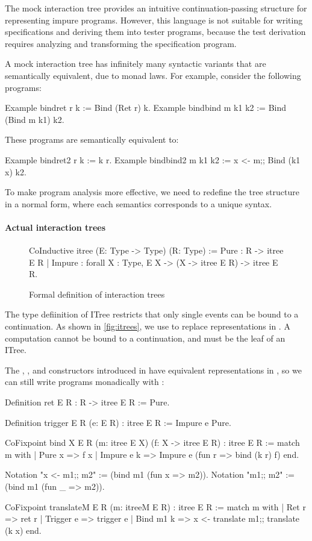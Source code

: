 The mock interaction tree provides an intuitive continuation-passing structure
for representing impure programs.  However, this language is not suitable for
writing specifications and deriving them into tester programs, because the test
derivation requires analyzing and transforming the specification program.

A mock interaction tree has infinitely many syntactic variants that are
semantically equivalent, due to monad laws.  For example, consider the following
programs:
\begin{coq}
  Example bindret  r k     := Bind (Ret r) k.
  Example bindbind m k1 k2 := Bind (Bind m k1) k2.
\end{coq}
These programs are semantically equivalent to:
\begin{coq}
  Example bindret2  r k     := k r.
  Example bindbind2 m k1 k2 := x <- m;; Bind (k1 x) k2.
\end{coq}

To make program analysis more effective, we need to redefine the tree structure
in a normal form, where each semantics corresponds to a unique syntax.

\paragraph{Actual interaction trees}
\begin{figure}
\begin{coq}
  CoInductive itree (E: Type -> Type) (R: Type) :=
    Pure   : R -> itree E R
  | Impure : forall {X : Type}, E X -> (X -> itree E R) -> itree E R.
\end{coq}
\caption{Formal definition of interaction trees}
\label{fig:itrees}
\end{figure}
The type defiinition of ITree restricts that only single events can be bound to
a continuation.  As shown in \autoref{fig:itrees}, we use  to
replace  representations in .  A
 computation cannot be bound to a continuation, and must be the leaf
of an ITree.

The , , and  constructors introduced in
 have equivalent representations in , so we can still
write programs monadically with \ilc{(;;)} :
\begin{coq}
  Definition ret {E R} : R -> itree E R := Pure.
  
  Definition trigger {E R} (e: E R) : itree E R := Impure e Pure.

  CoFixpoint bind {X E R} (m: itree E X) (f: X -> itree E R) : itree E R :=
    match m with
    | Pure   x   => f x
    | Impure e k => Impure e (fun r => bind (k r) f)
    end.

  Notation "x <- m1;; m2" := (bind m1 (fun x => m2)).
  Notation "m1;; m2"      := (bind m1 (fun _ => m2)).

  CoFixpoint translateM {E R} (m: itreeM E R) : itree E R :=
    match m with
    | Ret     r => ret r
    | Trigger e => trigger e
    | Bind m1 k => x <- translate m1;; translate (k x)
    end.
\end{coq}

